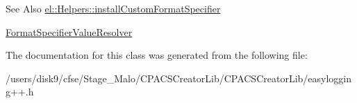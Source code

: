 \begin{DoxySeeAlso}{See Also}
\hyperlink{classel_1_1Helpers_aa6de15a09db4f2a6763a6652c0ea12b1}{el\-::\-Helpers\-::install\-Custom\-Format\-Specifier} 

\hyperlink{namespaceel_a7127f2de2769e2a199a3665f42028a16}{Format\-Specifier\-Value\-Resolver} 
\end{DoxySeeAlso}


The documentation for this class was generated from the following file\-:\begin{DoxyCompactItemize}
\item 
/users/disk9/cfse/\-Stage\-\_\-\-Malo/\-C\-P\-A\-C\-S\-Creator\-Lib/\-C\-P\-A\-C\-S\-Creator\-Lib/easylogging++.\-h\end{DoxyCompactItemize}
